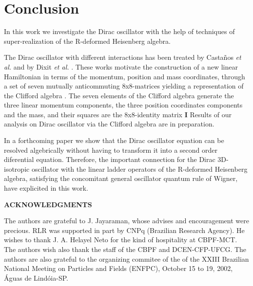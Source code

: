 \documentclass[a4paper,dvips,12pt]{article}
\begin{document}
\section{Conclusion}

In this work we investigate the
Dirac oscillator with the help of techniques
of super-realization of the R-deformed Heisenberg algebra.

The Dirac oscillator with different interactions has been treated by
Casta\~nos {\it et al.}  and by Dixit {\it et al.}
\cite{MZ}. These works
motivate the construction of a new linear Hamiltonian in terms of the
momentum, position and mass coordinates, through a set of seven  mutually
anticommuting 8x8-matrices yielding a representation of the Clifford
algebra \coordHE{}. The seven elements of the Clifford algebra \coordHE{}
generate the three linear momentum components, the three position
coordinates components and the mass, and their squares are the 8x8-identity
matrix {\bf I}\coordHE{}
Results of
our analysis on Dirac oscillator via  the Clifford algebra \coordHE{}
are in preparation.

In a forthcoming paper we show that the Dirac oscillator equation can be
resolved algebrically without having to transform it into a second order
diferential equation. Therefore, the important connection for the Dirac
3D-isotropic oscillator with the linear ladder operators of the R-deformed
Heisenberg algebra, satisfying the concomitant general oscillator quantum
rule of Wigner, have explicited in this work.


\vspace{1cm}
\centerline{\bf ACKNOWLEDGMENTS}

The authors are grateful to J. Jayaraman, whose advises and encouragement
were precious. RLR was supported in part by CNPq (Brazilian Research
Agency). He wishes to thank J. A. Helayel Neto for the kind of hospitality
at CBPF-MCT. The authors wish also thank the staff of the CBPF and
DCEN-CFP-UFCG. The authors are also grateful to the organizing commitee of
the of the XXIII Brazilian National Meeting on Particles and Fields
(ENFPC), October 15 to 19, 2002, \'Aguas de Lind\'oia-SP.
\end{document}
